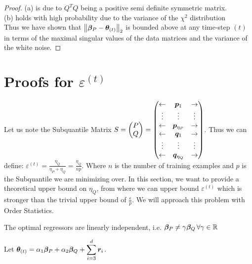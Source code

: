 \documentclass{article} %
\newcommand{\norm}[1]{\left\lVert#1\right\rVert}
\begin{document}
\begin{appendices}
\begin{proof}
	(a) is due to $Q^TQ$ being a positive semi definite symmetric matrix. \\ 
	(b) holds with high probability due to the variance of the $\chi^2$ distribution\\
	
	Thus we have shown that $\norm{\vbeta_P - \vtheta_{(t)}}_2$ is bounded above at any time-step $(t)$ in terms of the maximal singular values of the data matrices and the variance of the white noise. 
	
	\end{proof}

	\newpage
	
	\section{Proofs for $\varepsilon^{(t)}$}
	Let us note the Subquantile Matrix $\displaystyle S = \begin{pmatrix} P \\ Q \end{pmatrix} = \begin{pmatrix} \leftarrow & {\bm{p}}_1 & \rightarrow \\ \vdots & \vdots & \vdots \\ \leftarrow & {\bm{p}}_{\eta_P} & \rightarrow \\ \leftarrow & {\bm{q}}_1 & \rightarrow \\ \vdots & \vdots & \vdots \\ \leftarrow & {\bm{q}}_{\eta_Q} & \rightarrow\end{pmatrix}$. Thus we can define: $\displaystyle \varepsilon^{(t)} = \frac{\eta_Q}{\eta_P + \eta_Q} = \frac{\eta_Q}{np}$. Where $n$ is the number of training examples and $p$ is the Subquantile we are minimizing over. In this section, we want to provide a theoretical upper bound on $\eta_Q$, from where we can upper bound $\varepsilon^{(t)}$ which is stronger than the trivial upper bound of $\displaystyle \frac{\epsilon}{p}$. We will approach this problem with Order Statistics.
	\begin{assumption}
		The optimal regressors are linearly independent, i.e. ${\bm{\beta}}_P \neq \gamma {\bm{\beta}}_Q\, \forall \gamma \in \mathbb{R}$
	\end{assumption}
	Let $\displaystyle {\bm{\theta}}_{(t)} = \alpha_1 {\bm{\beta}}_P + \alpha_2 {\bm{\beta}}_Q + \sum_{i=3}^{d}{\bm{r}}_i$.
	

\end{appendices}
\end{document}
